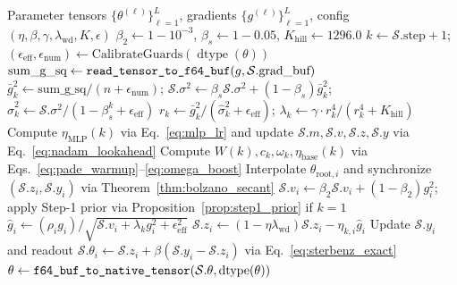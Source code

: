 \documentclass[10pt,twocolumn,letterpaper]{article}
\theoremstyle{definition}
\theoremstyle{remark}
\newcommand{\epseff}{\epsilon_{\mathrm{eff}}}
\begin{document}
\begin{algorithm}[t]
\caption{\texttt{SelfOptimizingMeta::step} (Zero-Allocation Native-Storage Update)}
\label{alg:meta_optimizer}
\begin{algorithmic}[1]
\Require Parameter tensors $\{\theta^{(\ell)}\}_{\ell=1}^L$, gradients $\{g^{(\ell)}\}_{\ell=1}^L$, config $(\eta, \beta, \gamma, \lambda_{\mathrm{wd}}, K, \epsilon)$
\State $\beta_2 \gets 1 - 10^{-3}$, $\beta_s \gets 1 - 0.05$, $K_{\mathrm{hill}} \gets 1296.0$
  \State $k \gets \mathcal{S}.\text{step} + 1$; \quad $(\epseff, \epsilon_{\mathrm{num}}) \gets \text{CalibrateGuards}(\operatorname{dtype}(\theta))$
  \State $\text{sum\_g\_sq} \gets \text{\texttt{read\_tensor\_to\_f64\_buf}}(g, \mathcal{S}.\text{grad\_buf})$ 
  \State $\bar{g}_k^2 \gets \text{sum\_g\_sq} / (n + \epsilon_{\mathrm{num}})$; \quad $\mathcal{S}.\sigma^2 \gets \beta_s \mathcal{S}.\sigma^2 + (1-\beta_s)\bar{g}_k^2$; \quad $\hat{\sigma}_k^2 \gets \mathcal{S}.\sigma^2 / (1 - \beta_s^k + \epseff)$
  \State $r_k \gets \bar{g}_k^2 / (\hat{\sigma}_k^2 + \epseff)$; \quad $\lambda_k \gets \gamma \cdot r_k^4 / (r_k^4 + K_{\mathrm{hill}})$ 
   
    \State Compute $\eta_{\mathrm{MLP}}(k)$ via Eq.~\eqref{eq:mlp_lr} and update $\mathcal{S}.m, \mathcal{S}.v, \mathcal{S}.z, \mathcal{S}.y$ via Eq.~\eqref{eq:nadam_lookahead}
  \Else {}
    \State Compute $W(k), c_k, \omega_k, \eta_{\mathrm{base}}(k)$ via Eqs.~\eqref{eq:pade_warmup}--\eqref{eq:omega_boost}
        \State Interpolate $\theta_{\mathrm{root},i}$ and synchronize $(\mathcal{S}.z_i, \mathcal{S}.y_i)$ via Theorem~\ref{thm:bolzano_secant}
      \EndIf
      \State $\mathcal{S}.v_i \gets \beta_2 \mathcal{S}.v_i + (1-\beta_2)g_i^2$; apply Step-1 prior via Proposition~\ref{prop:step1_prior} if $k=1$
      \State $\hat{g}_i \gets (\rho_i g_i) / \sqrt{\mathcal{S}.v_i + \lambda_k g_i^2 + \epseff^2}$
      \State $\mathcal{S}.z_i \gets (1 - \eta\lambda_{\mathrm{wd}})\mathcal{S}.z_i - \eta_{k,i} \hat{g}_i$
      \State Update $\mathcal{S}.y_i$ and readout $\mathcal{S}.\theta_i \gets \mathcal{S}.z_i + \beta(\mathcal{S}.y_i - \mathcal{S}.z_i)$ via Eq.~\eqref{eq:sterbenz_exact}
    \EndFor
  \EndIf
  \State $\theta \gets \text{\texttt{f64\_buf\_to\_native\_tensor}}(\mathcal{S}.\theta, \operatorname{dtype}(\theta))$ 
\EndFor
\end{algorithmic}
\end{algorithm}
\end{document}

